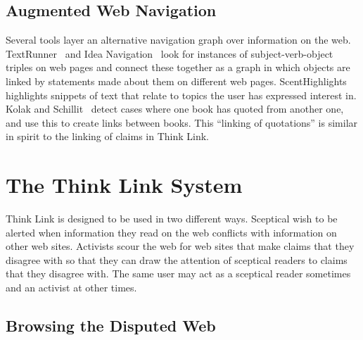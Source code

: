 \documentclass{chi2009}
\newcommand{\todo}[1]{}
\begin{document}
\todo{Ask Nicholas if he would like to read the paper}

\subsection{Augmented Web Navigation}

Several tools layer an alternative navigation graph over information on the web. TextRunner~\cite{Etzioni2008} and Idea Navigation~\cite{Etzioni2008} look for instances of subject-verb-object triples on web pages and connect these together as a graph in which objects are linked by statements made about them on different web pages. ScentHighlights~\cite{Chi2005a} highlights snippets of text that relate to topics the user has expressed interest in. Kolak and Schillit~\cite{Kolak2008} detect cases where one book has quoted from another one, and use this to create links between books. This ``linking of quotations'' is similar in spirit to the linking of claims in Think Link. 

% 

% 

\section{The Think Link System}

Think Link is designed to be used in two different ways. Sceptical wish to be alerted when information they read on the web conflicts with information on other web sites. Activists scour the web for web sites that make claims that they disagree with so that they can draw the attention of sceptical readers to claims that they disagree with. The same user may act as a sceptical reader sometimes and an activist at other times.

\subsection{Browsing the Disputed Web}
\end{document}
